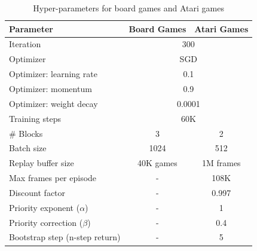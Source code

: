 \begin{table}
    \caption{Hyper-parameters for board games and Atari games}
    \centering
    \begin{tabular}{lcc}
        \toprule
        Parameter & Board Games & Atari Games\\
        \midrule
        Iteration & \multicolumn{2}{c}{300}\\
        Optimizer & \multicolumn{2}{c}{SGD}\\
        Optimizer: learning rate & \multicolumn{2}{c}{0.1}\\
        Optimizer: momentum & \multicolumn{2}{c}{0.9}\\
        Optimizer: weight decay & \multicolumn{2}{c}{0.0001}\\
        Training steps & \multicolumn{2}{c}{60K}\\
        \# Blocks & 3 & 2\\
        Batch size & 1024 & 512\\
        Replay buffer size & 40K games & 1M frames\\
        Max frames per episode & - & 108K\\
        Discount factor & - & 0.997\\
        Priority exponent ($\alpha$) & - & 1\\
        Priority correction ($\beta$) & - & 0.4\\
        Bootstrap step (n-step return) & - & 5\\
        \bottomrule
    \end{tabular}
    \label{tab:hyper-parameters}
\end{table}


